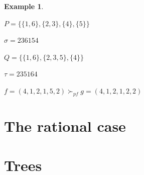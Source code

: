\documentclass[12pt]{report}
\newtheorem*{example}{Example}
\begin{document}
\begin{example}
    \text{}\\
    \begin{itemize*}
        \item $P = \{\{1, 6\}, \{2, 3\}, \{4\}, \{5\}\}$\\
        \item $\sigma = 236154$\\
        \item $Q = \{\{1, 6\}, \{2, 3, 5\}, \{4\}\}$\\
        \item $\tau = 235164$\\
        \item $f = (4, 1, 2, 1, 5, 2) \succ_{pf}
            g = (4, 1, 2, 1, 2, 2)$\\
    \end{itemize*}
\end{example}

\chapter{The rational case}

\chapter{Trees}
\end{document}
